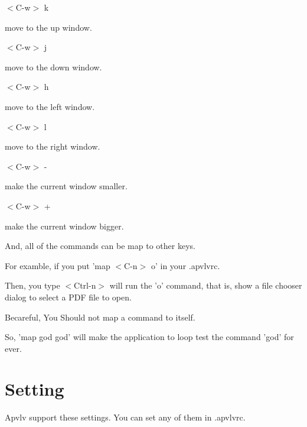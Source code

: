 \documentclass[a4paper,12pt]{article}
\begin{document}
\begin{description}
\item $<$C-w$>$ k

move to the up window.

\item $<$C-w$>$ j

move to the down window.

\item $<$C-w$>$ h

move to the left window.

\item $<$C-w$>$ l

move to the right window.

\item $<$C-w$>$ -

make the current window smaller.

\item $<$C-w$>$ +

make the current window bigger.

\end{description}

And, all of the commands can be map to other keys.

For examble, if you put 
'map $<$C-n$>$ o'
in your .apvlvrc.

Then, you type $<$Ctrl-n$>$ will run the 'o' command, that is, show a file chooser dialog to select a PDF file to open.

Becareful, You Should not map a command to itself.

So, 'map god god' will make the application to loop test the command 'god' for ever.

\newpage

\section{Setting}

Apvlv support these settings. You can set any of them in .apvlvrc.
\end{document}
